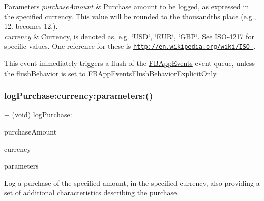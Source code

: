 \begin{DoxyParams}{Parameters}
{\em purchase\+Amount} & Purchase amount to be logged, as expressed in the specified currency. This value will be rounded to the thousandths place (e.\+g., 12. becomes 12.).\\
\hline
{\em currency} & Currency, is denoted as, e.\+g. \char`\"{}\+U\+S\+D\char`\"{}, \char`\"{}\+E\+U\+R\char`\"{}, \char`\"{}\+G\+B\+P\char`\"{}. See I\+S\+O-\/4217 for specific values. One reference for these is \href{http://en.wikipedia.org/wiki/ISO_4217}{\tt http\+://en.\+wikipedia.\+org/wiki/\+I\+S\+O\+\_}.\\
\hline
\end{DoxyParams}
This event immediately triggers a flush of the {\ttfamily \hyperlink{interfaceFBAppEvents}{F\+B\+App\+Events}} event queue, unless the {\ttfamily flush\+Behavior} is set to {\ttfamily F\+B\+App\+Events\+Flush\+Behavior\+Explicit\+Only}. \mbox{\label{interfaceFBAppEvents_aa77be4e60be97432ca9f6e3afe8d7b7f}} 
\subsubsection{\texorpdfstring{log\+Purchase\+:currency\+:parameters\+:()}{logPurchase:currency:parameters:()}\hspace{0.1cm}{\footnotesize\ttfamily [1/5]}}
{\footnotesize\ttfamily + (void) log\+Purchase\+: \begin{DoxyParamCaption}\item[{(double)}]{purchase\+Amount }\item[{currency:(N\+S\+String $\ast$)}]{currency }\item[{parameters:(N\+S\+Dictionary $\ast$)}]{parameters }\end{DoxyParamCaption}}

Log a purchase of the specified amount, in the specified currency, also providing a set of additional characteristics describing the purchase.


